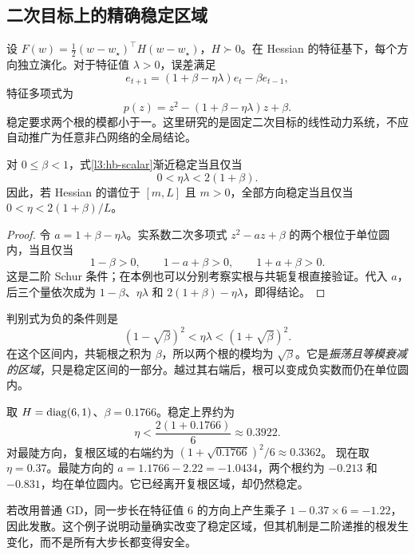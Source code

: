 \subsection{二次目标上的精确稳定区域}

设 $F(w)=\tfrac12(w-w_\star)^\top H(w-w_\star)$，$H\succ0$。在 Hessian 的特征基下，每个方向独立演化。对于特征值 $\lambda>0$，误差满足
\begin{equation}
 e_{t+1}=(1+\beta-\eta\lambda)e_t-\beta e_{t-1},
 \label{l3:hb-scalar}
\end{equation}
特征多项式为
\begin{equation}
 p(z)=z^2-(1+\beta-\eta\lambda)z+\beta.
 \label{l3:hb-polynomial}
\end{equation}
稳定要求两个根的模都小于一。这里研究的是固定二次目标的线性动力系统，不应自动推广为任意非凸网络的全局结论。

\begin{proposition}
对 $0\leq\beta<1$，式\eqref{l3:hb-scalar}渐近稳定当且仅当
\begin{equation}
 \boxed{0<\eta\lambda<2(1+\beta)}.
 \label{l3:hb-stability}
\end{equation}
因此，若 Hessian 的谱位于 $[m,L]$ 且 $m>0$，全部方向稳定当且仅当
$0<\eta<2(1+\beta)/L$。
\end{proposition}
\begin{proof}
令 $a=1+\beta-\eta\lambda$。实系数二次多项式 $z^2-az+\beta$ 的两个根位于单位圆内，当且仅当
\[
 1-\beta>0,\qquad 1-a+\beta>0,\qquad 1+a+\beta>0.
\]
这是二阶 Schur 条件；在本例也可以分别考察实根与共轭复根直接验证。代入 $a$，后三个量依次成为
$1-\beta$、$\eta\lambda$ 和 $2(1+\beta)-\eta\lambda$，即得结论。
\end{proof}

判别式为负的条件则是
\begin{equation}
 (1-\sqrt\beta)^2<\eta\lambda<(1+\sqrt\beta)^2.
 \label{l3:hb-complex-region}
\end{equation}
在这个区间内，共轭根之积为 $\beta$，所以两个根的模均为 $\sqrt\beta$。它是\emph{振荡且等模衰减的区域}，只是稳定区间的一部分。越过其右端后，根可以变成负实数而仍在单位圆内。

\begin{example}[复根区间的右端并非稳定边界]
取 $H=\operatorname{diag}(6,1)$、$\beta=0.1766$。稳定上界约为
\[
 \eta<\frac{2(1+0.1766)}6\approx0.3922.
\]
对最陡方向，复根区域的右端约为
$(1+\sqrt{0.1766})^2/6\approx0.3362$。
现在取 $\eta=0.37$。最陡方向的 $a=1.1766-2.22=-1.0434$，两个根约为 $-0.213$ 和 $-0.831$，均在单位圆内。它已经离开复根区域，却仍然稳定。

若改用普通 GD，同一步长在特征值 $6$ 的方向上产生乘子 $1-0.37\times6=-1.22$，因此发散。这个例子说明动量确实改变了稳定区域，但其机制是二阶递推的根发生变化，而不是所有大步长都变得安全。
\end{example}

